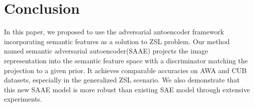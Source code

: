 \documentclass{article}
\begin{document}
\section{Conclusion}

In this paper, we proposed to use the adversarial antoencoder framework incorporating semantic features as a solution to ZSL problem. Our method named semantic adversarial autoencoder(SAAE) projects the image representation into the semantic feature space with a discriminator matching the projection to a given prior. It achieves comparable accuracies on AWA and CUB datasets, especially in the generalized ZSL scenario. We also demonstrate that this new SAAE model is more robust than existing SAE model through extensive experiments. 


\newpage



\end{document}
